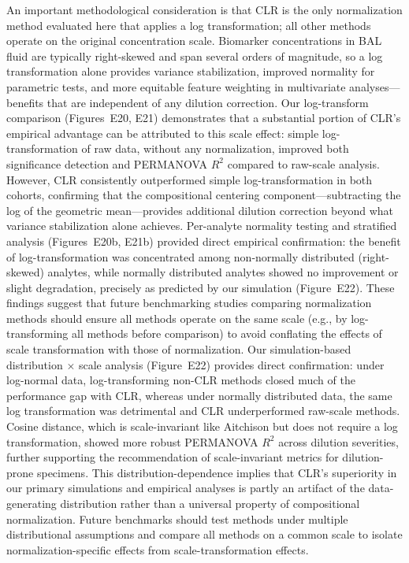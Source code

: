 \documentclass[12pt]{article}
\begin{document}
An important methodological consideration is that CLR is the only normalization method evaluated here that applies a log transformation; all other methods operate on the original concentration scale. Biomarker concentrations in BAL fluid are typically right-skewed and span several orders of magnitude, so a log transformation alone provides variance stabilization, improved normality for parametric tests, and more equitable feature weighting in multivariate analyses---benefits that are independent of any dilution correction. Our log-transform comparison (Figures~E20, E21) demonstrates that a substantial portion of CLR's empirical advantage can be attributed to this scale effect: simple log-transformation of raw data, without any normalization, improved both significance detection and PERMANOVA $R^2$ compared to raw-scale analysis. However, CLR consistently outperformed simple log-transformation in both cohorts, confirming that the compositional centering component---subtracting the log of the geometric mean---provides additional dilution correction beyond what variance stabilization alone achieves. Per-analyte normality testing and stratified analysis (Figures~E20b, E21b) provided direct empirical confirmation: the benefit of log-transformation was concentrated among non-normally distributed (right-skewed) analytes, while normally distributed analytes showed no improvement or slight degradation, precisely as predicted by our simulation (Figure~E22). These findings suggest that future benchmarking studies comparing normalization methods should ensure all methods operate on the same scale (e.g., by log-transforming all methods before comparison) to avoid conflating the effects of scale transformation with those of normalization. Our simulation-based distribution $\times$ scale analysis (Figure~E22) provides direct confirmation: under log-normal data, log-transforming non-CLR methods closed much of the performance gap with CLR, whereas under normally distributed data, the same log transformation was detrimental and CLR underperformed raw-scale methods. Cosine distance, which is scale-invariant like Aitchison but does not require a log transformation, showed more robust PERMANOVA $R^2$ across dilution severities, further supporting the recommendation of scale-invariant metrics for dilution-prone specimens. This distribution-dependence implies that CLR's superiority in our primary simulations and empirical analyses is partly an artifact of the data-generating distribution rather than a universal property of compositional normalization. Future benchmarks should test methods under multiple distributional assumptions and compare all methods on a common scale to isolate normalization-specific effects from scale-transformation effects.
\end{document}
